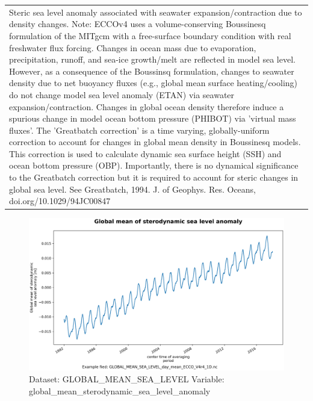 \begin{longtable}{|m{}|m{}|m{}|m{}|}
\rowcolor{lightgray} \multicolumn{4}{|p{1.00\textwidth}|}{\textbf{Comments}} \\ \hline
\multicolumn{4}{|p{1\textwidth}|}{Steric sea level anomaly associated with seawater expansion/contraction due to density changes. Note: ECCOv4 uses a volume-conserving Boussinesq formulation of the MITgcm with a free-surface boundary condition with real freshwater flux forcing. Changes in ocean mass due to evaporation, precipitation, runoff, and sea-ice growth/melt are reflected in model sea level. However, as a consequence of the Boussinsq formulation, changes to seawater density due to net buoyancy fluxes (e.g., global mean surface heating/cooling) do not change model sea level anomaly (ETAN) via seawater expansion/contraction. Changes in global ocean density therefore induce a spurious change in model ocean bottom pressure (PHIBOT) via 'virtual mass fluxes'. The 'Greatbatch correction' is a time varying, globally-uniform correction to account for changes in global mean density in Boussinesq models. This correction is used to calculate dynamic sea surface height (SSH) and ocean bottom pressure (OBP). Importantly, there is no dynamical significance to the Greatbatch correction but it is required to account for steric changes in global sea level. See Greatbatch, 1994. J. of Geophys. Res. Oceans, doi.org/10.1029/94JC00847} \\ \hline
\end{longtable}

\begin{figure}[H]
\centering
\includegraphics[scale=0.55]{../images/plots/oneD_plots/Global_Mean_Sea_Level/global_mean_sterodynamic_sea_level_anomaly.png}
\caption{Dataset: GLOBAL\_MEAN\_SEA\_LEVEL Variable: global\_mean\_sterodynamic\_sea\_level\_anomaly}
\label{tab:table-GLOBAL_MEAN_SEA_LEVEL_global_mean_sterodynamic_sea_level_anomaly-Plot}
\end{figure}
\pagebreak
